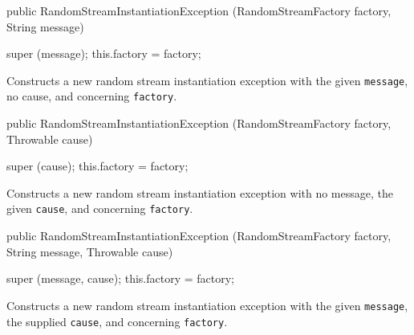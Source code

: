 \begin{code}

   public RandomStreamInstantiationException (RandomStreamFactory factory,
                                         String message)\begin{hide} {
      super (message);
      this.factory = factory;
   }\end{hide}
\end{code}
\begin{tabb}   Constructs a new random stream instantiation exception with
 the given \texttt{message}, no cause, and concerning \texttt{factory}.
\end{tabb}
\begin{htmlonly}
\end{htmlonly}
\begin{code}

   public RandomStreamInstantiationException (RandomStreamFactory factory,
                                         Throwable cause)\begin{hide} {
      super (cause);
      this.factory = factory;
   }\end{hide}
\end{code}
\begin{tabb}   Constructs a new random stream instantiation exception with
 no message, the given \texttt{cause}, and concerning \texttt{factory}.
\end{tabb}
\begin{htmlonly}
\end{htmlonly}
\begin{code}

   public RandomStreamInstantiationException (RandomStreamFactory factory,
                                         String message, Throwable cause)\begin{hide} {
      super (message, cause);
      this.factory = factory;
   }\end{hide}
\end{code}
\begin{tabb}   Constructs a new random stream instantiation exception with
 the given \texttt{message}, the supplied \texttt{cause}, 
 and concerning \texttt{factory}.
\end{tabb}
\begin{htmlonly}
\end{htmlonly}
